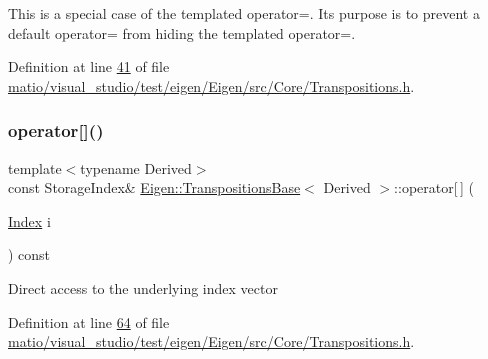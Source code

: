 This is a special case of the templated operator=. Its purpose is to prevent a default operator= from hiding the templated operator=. 

Definition at line \hyperlink{matio_2visual__studio_2test_2eigen_2_eigen_2src_2_core_2_transpositions_8h_source_l00041}{41} of file \hyperlink{matio_2visual__studio_2test_2eigen_2_eigen_2src_2_core_2_transpositions_8h_source}{matio/visual\+\_\+studio/test/eigen/\+Eigen/src/\+Core/\+Transpositions.\+h}.

\mbox{\label{class_eigen_1_1_transpositions_base_a689c79a6cdac938218de46638decb895}} 
\subsubsection{\texorpdfstring{operator[]()}{operator[]()}\hspace{0.1cm}{\footnotesize\ttfamily [1/4]}}
{\footnotesize\ttfamily template$<$typename Derived$>$ \\
const Storage\+Index\& \hyperlink{class_eigen_1_1_transpositions_base}{Eigen\+::\+Transpositions\+Base}$<$ Derived $>$\+::operator\mbox{[}$\,$\mbox{]} (\begin{DoxyParamCaption}\item[{\hyperlink{class_eigen_1_1_transpositions_base_a3f5f06118b419e8e6ccbe49ed5b4c91f}{Index}}]{i }\end{DoxyParamCaption}) const\hspace{0.3cm}{\ttfamily [inline]}}

Direct access to the underlying index vector 

Definition at line \hyperlink{matio_2visual__studio_2test_2eigen_2_eigen_2src_2_core_2_transpositions_8h_source_l00064}{64} of file \hyperlink{matio_2visual__studio_2test_2eigen_2_eigen_2src_2_core_2_transpositions_8h_source}{matio/visual\+\_\+studio/test/eigen/\+Eigen/src/\+Core/\+Transpositions.\+h}.

\mbox{\label{class_eigen_1_1_transpositions_base_a689c79a6cdac938218de46638decb895}} 
